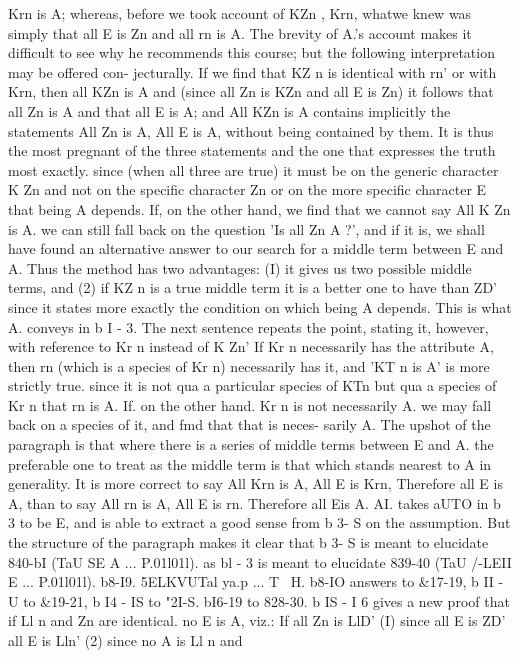 {{{{{{{{{{{{{{{{{{{Krn is A; whereas, before we took account of KZn , Krn, whatwe knew was simply that all E is Zn and all rn is A. The brevity
of A.'s account makes it difficult to see why he recommends this
course; but the following interpretation may be offered con-
jecturally. If we find that KZ n is identical with rn' or with
Krn, then all KZn is A and (since all Zn is KZn and all E is Zn)
it follows that all Zn is A and that all E is A; and All KZn is A
contains implicitly the statements All Zn is A, All E is A,
without being contained by them. It is thus the most pregnant
of the three statements and the one that expresses the truth most
exactly. since (when all three are true) it must be on the generic
character K Zn and not on the specific character Zn or on the
more specific character E that being A depends. If, on the other
hand, we find that we cannot say All K Zn is A. we can still fall
back on the question 'Is all Zn A ?', and if it is, we shall have
found an alternative answer to our search for a middle term
between E and A. Thus the method has two advantages: (I) it
gives us two possible middle terms, and (2) if KZ n is a true middle
term it is a better one to have than ZD' since it states more
exactly the condition on which being A depends. This is what
A. conveys in b I - 3. The next sentence repeats the point, stating
it, however, with reference to Kr n instead of K Zn' If Kr n
necessarily has the attribute A, then rn (which is a species of
Kr n) necessarily has it, and 'KT n is A' is more strictly true. since
it is not qua a particular species of KTn but qua a species of Kr n
that rn is A. If. on the other hand. Kr n is not necessarily A.
we may fall back on a species of it, and fmd that that is neces-
sarily A.
The upshot of the paragraph is that where there is a series of
middle terms between E and A. the preferable one to treat as
the middle term is that which stands nearest to A in generality.
It is more correct to say All Krn is A, All E is Krn, Therefore
all E is A, than to say All rn is A, All E is rn. Therefore all
Eis A.
AI. takes aUTO in b 3 to be E, and is able to extract a good sense
from b 3- S on the assumption. But the structure of the paragraph
makes it clear that b 3- S is meant to elucidate 840-bI (TaU SE A ...
P.01l01l). as bl - 3 is meant to elucidate 839-40 (TaU /-LEII E ... P.01l01l).
b8-I9. 5ELKVUTal ya.p ... T~ H. b8-IO answers to &17-19, b II - U
to &19-21, b I4 - IS to "2I-S. bI6-19 to 828-30. b IS - I 6 gives a new
proof that if Ll n and Zn are identical. no E is A, viz.: If all Zn
is LlD' (I) since all E is ZD' all E is Lln' (2) since no A is Ll n and
}}}}}}}}}}}}}}}}}}}

